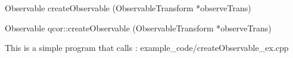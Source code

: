 \apisummary{
    
}

\begin{apidefinition}

\begin{Csynopsis}
    Observable createObservable (ObservableTransform *observeTrans)
\end{Csynopsis}

\begin{Cppsynopsis}
    Observable qcor::createObservable (ObservableTransform *observeTrans)
\end{Cppsynopsis}


\begin{apiarguments}
\end{apiarguments}

\apidescription{
    
}


\apinotes{
    
}

\begin{apiexamples}

\apicppexample
    { This is a simple program that calls : } 
    { example_code/createObservable_ex.cpp} 
    {}

\end{apiexamples}

\end{apidefinition}
